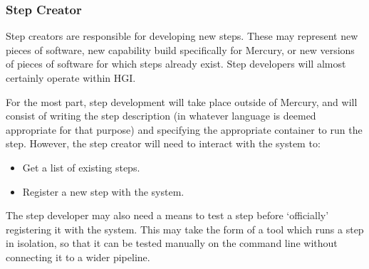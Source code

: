 \documentclass[10pt,a4paper]{article}
\newcommand{\npar}{\par\noindent\space}
\begin{document}
\subsubsection{Step Creator}
\npar Step creators are responsible for developing new \glspl{step}. These may represent new pieces of software, new capability build specifically for Mercury, or new versions of pieces of software for which steps already exist. Step developers will almost certainly operate within HGI.
\npar For the most part, step development will take place outside of Mercury, and will consist of writing the step description (in whatever language is deemed appropriate for that purpose) and specifying the appropriate container to run the step. However, the step creator will need to interact with the system to:
\begin{itemize}
\item Get a list of existing steps.
\item Register a new step with the system.
\end{itemize}
\npar The step developer may also need a means to test a step before `officially' registering it with the system. This may take the form of a tool which runs a step in isolation, so that it can be tested manually on the command line without connecting it to a wider pipeline.
\end{document}
